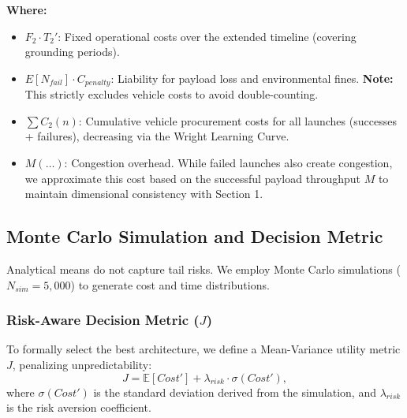 \documentclass{mcmthesis}
\begin{document}
\noindent \textbf{Where:}
\begin{itemize}
    \item $F_2 \cdot T_2'$: Fixed operational costs over the extended timeline (covering grounding periods).
    \item $E[N_{fail}] \cdot C_{penalty}$: Liability for payload loss and environmental fines. \textbf{Note:} This strictly excludes vehicle costs to avoid double-counting.
    \item $\sum C_2(n)$: Cumulative vehicle procurement costs for all launches (successes + failures), decreasing via the Wright Learning Curve.
    \item $M(\dots)$: Congestion overhead. While failed launches also create congestion, we approximate this cost based on the successful payload throughput $M$ to maintain dimensional consistency with Section 1.
\end{itemize}

\subsection{Monte Carlo Simulation and Decision Metric}
Analytical means do not capture tail risks. We employ Monte Carlo simulations ($N_{sim}=5,000$) to generate cost and time distributions.

\subsubsection{Risk-Aware Decision Metric ($J$)}
To formally select the best architecture, we define a Mean-Variance utility metric $J$, penalizing unpredictability:
\begin{equation}
    J = \mathbb{E}[Cost'] + \lambda_{risk} \cdot \sigma(Cost'),
\end{equation}
where $\sigma(Cost')$ is the standard deviation derived from the simulation, and $\lambda_{risk}$ is the risk aversion coefficient.
\end{document}
